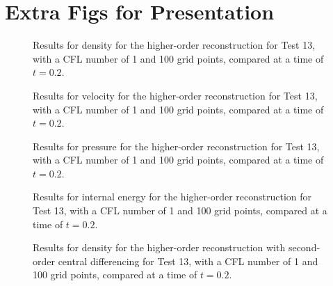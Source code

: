 \chapter{Extra Figs for Presentation}


\begin{figure}
	\caption[Results for density for the higher-order reconstruction for Test 13, with a CFL number of 1 and 100 grid points, compared at a time of $t=0.2$.]{Results for density for the higher-order reconstruction for Test 13, with a CFL number of 1 and 100 grid points, compared at a time of $t=0.2$.}
	\label{fig:Test13HORdensity}
\end{figure}

\begin{figure}
	\caption[Results for velocity for the higher-order reconstruction for Test 13, with a CFL number of 1 and 100 grid points, compared at a time of $t=0.2$.]{Results for velocity for the higher-order reconstruction for Test 13, with a CFL number of 1 and 100 grid points, compared at a time of $t=0.2$.}
	\label{fig:Test13HORvelocity}
\end{figure}

\begin{figure}
	\caption[Results for pressure for the higher-order reconstruction for Test 13, with a CFL number of 1 and 100 grid points, compared at a time of $t=0.2$.]{Results for pressure for the higher-order reconstruction for Test 13, with a CFL number of 1 and 100 grid points, compared at a time of $t=0.2$.}
	\label{fig:Test13HORpressure}
\end{figure}

\begin{figure}
	\caption[Results for internal energy for the higher-order reconstruction for Test 13, with a CFL number of 1 and 100 grid points, compared at a time of $t=0.2$.]{Results for internal energy for the higher-order reconstruction for Test 13, with a CFL number of 1 and 100 grid points, compared at a time of $t=0.2$.}
	\label{fig:Test13HORenergy}
\end{figure}

\begin{figure}
	\caption[Results for density for the higher-order reconstruction with second-order central differencing for Test 13, with a CFL number of 1 and 100 grid points, compared at a time of $t=0.2$.]{Results for density for the higher-order reconstruction with second-order central differencing for Test 13, with a CFL number of 1 and 100 grid points, compared at a time of $t=0.2$.}
	\label{fig:Test13HORCD2density}
\end{figure}


